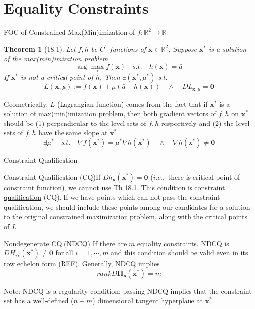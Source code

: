 \documentclass[a4paper,11pt]{article}
\newtheorem{thm}{Theorem}
\newcommand{\bb}{\mathbb}
\newcommand{\bd}{\mathbf}
\begin{document}
\section{Equality Constraints} %
\label{sec:equality_constraints}
\begin{frame}[t]{FOC of Constrained Max(Min)imization of $f:\bb{R}^2\rightarrow\bb{R}$}
	\begin{thm}
		[18.1] Let $f,h$ be $C^1$ functions of $\bd{x}\in\bb{R}^2$. Suppose $\bd{x^\ast}$ is a solution of the max(min)imization problem\[
			\arg\max_{\bd{x}} f(\bd{x}) \quad s.t. \quad h(\bd{x})=\bar a
		\]
		If $\bd{x^\ast}$ is not a critical point of $h$, Then $\exists (\bd{x}^\ast,\mu^\ast)$ s.t. \[
			L(\bd{x},\mu):= f(\bd{x})+\mu(\bar{a}-h(\bd{x}))\quad\land\quad DL_{\bd{x},\mu}=\bd{0}
		\]
	\end{thm}
	Geometrically, $L$ (Lagrangian function) comes from the fact that if $\bd{x^\ast}$ is a solution of max(min)imization problem, then both gradient vectors of $f,h$ on $\bd{x^\ast}$ should be (1) perpendicular to the level sets of $f,h$ respectively and (2) the level sets of $f,h$ have the same slope at $\bd{x^\ast}$\[
		\exists \mu^\ast \quad s.t.\quad \nabla f (\bd{x^\ast}) = \mu^\ast \nabla h (\bd{x^\ast}) \quad \land\quad \nabla h(\bd{x^\ast})\neq\bd{0}
	\]
\end{frame}
\begin{frame}[t]{Constraint Qualification}
	\begin{block}
		{Constraint Qualification (CQ)}If $Dh_{\bd{x}}(\bd{x^\ast})=\mathbf{0}$ ($i.e.,$ there is critical point of constraint function),  we cannot use Th 18.1. This condition is \uline{constraint qualification} (CQ). If we have points which can not pass the constraint qualification, we should include these points among our candidates for a solution to the original constrained maximization problem, along with the critical points of $L$
	\end{block}
	\begin{block}
		{Nondegenerate CQ (NDCQ)} If there are $m$ equality constraints, NDCQ is $DH_{i\bd{x}}(\bd{x^\ast})\neq \bd{0}$ for all $i=1,\cdots,m$ and this condition should be valid even in its row echelon form (REF). Generally, NDCQ implies \[
			rank D\bd{H}_{\bd{x}}(\bd{x^\ast}) = m
		\]
	\end{block}
	Note: NDCQ is a regularity condition: passing NDCQ implies that the constraint set has a well-defined ($n-m$) dimensional tangent hyperplane at $\bd{x^\ast}$.
\end{frame}
\end{document}
